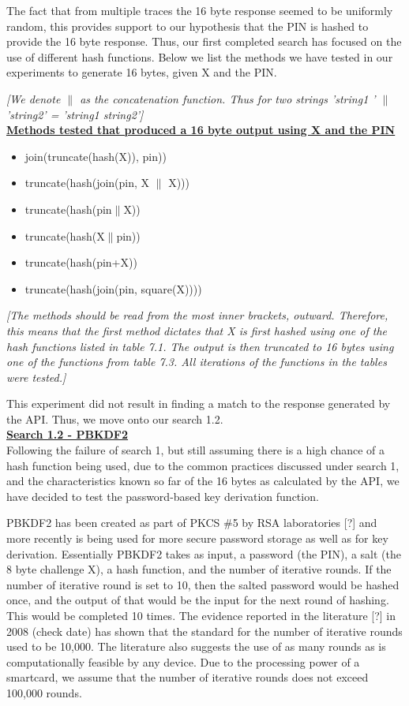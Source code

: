 \documentclass[bsc,frontabs,twoside,singlespacing,parskip,deptreport]{infthesis}     %
\begin{document}
The fact that from multiple traces the 16 byte response seemed to be uniformly random, this provides support to our hypothesis that the PIN is hashed to provide the 16 byte response. Thus, our first completed search has focused on the use of different hash functions. Below we list the methods we have tested in our experiments to generate 16 bytes, given X and the PIN.

\textit{[We denote $\|$ as the concatenation function. Thus for two strings 'string1 ' $\|$ 'string2' = 'string1 string2']}\\

\textbf{\underline{Methods tested that produced a 16 byte output using X and the PIN}}
\begin{itemize}
\item join(truncate(hash(X)), pin))
\item truncate(hash(join(pin, X $\|$ X)))
\item truncate(hash(pin$\|$X))
\item truncate(hash(X$\|$pin))
\item truncate(hash(pin+X))
\item truncate(hash(join(pin, square(X))))
\end{itemize}

\textit{[The methods should be read from the most inner brackets, outward. Therefore, this means that the first method dictates that X is first hashed using one of the hash functions listed in table 7.1. The output is then truncated to 16 bytes using one of the functions from table 7.3. All iterations of the functions in the tables were tested.]}

This experiment did not result in finding a match to the response generated by the API. Thus, we move onto our search 1.2.\\


\textbf{\underline{Search 1.2 - PBKDF2}}\\
Following the failure of search 1, but still assuming there is a high chance of a hash function being used, due to the common practices discussed under search 1, and the characteristics known so far of the 16 bytes as calculated by the API, we have decided to test the password-based key derivation function.  

PBKDF2 has been created as part of PKCS \#5 by RSA laboratories [?] and more recently is being used for more secure password storage as well as for key derivation. Essentially PBKDF2 takes as input, a password (the PIN), a salt (the 8 byte challenge X), a hash function, and the number of iterative rounds. If the number of iterative round is set to 10, then the salted password would be hashed once, and the output of that would be the input for the next round of hashing. This would be completed 10 times. The evidence reported in the literature [?] in 2008 (check date) has shown that the standard for the number of iterative rounds used to be 10,000. The literature also suggests the use of as many rounds as is computationally feasible by any device. Due to the processing power of a smartcard, we assume that the number of iterative rounds does not exceed 100,000 rounds.
\end{document}
